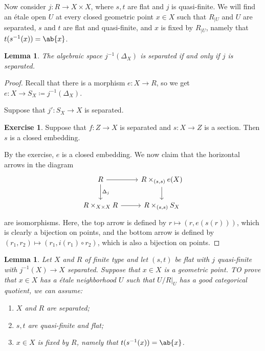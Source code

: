 \documentclass{amsart}
\newtheorem{lem}[thm]{Lemma}
\theoremstyle{definition}
\newtheorem{exer}[thm]{Exercise}
\theoremstyle{remark}
\theoremstyle{plain}
\theoremstyle{definition}
\theoremstyle{remark}
\newcommand{\1}{\mathbf{1}}
\newcommand{\2}{\mathbf{2}}
\newcommand{\3}{\mathbf{3}}
\begin{document}
    Now consider \(j \colon R \to X \times X\), where \(s,t\) are flat and \(j\) is quasi-finite. We will find an \'etale open \(U\) at every closed geometric point \(x \in X\) such that \(R_{|U}\) and \(U\) are separated, \(s\) and \(t\) are flat and quasi-finite, and \(x\) is fixed by \(R_{|U}\), namely that \(t(s^{-1}(x)) = \ab\{x\}\).

    \begin{lem}
        The algebraic space \(j^{-1}(\Delta_X)\) is separated if and only if \(j\) is separated. 
    \end{lem}
    \begin{proof}
        Recall that there is a morphism \(e \colon X \to R\), so we get \(e \colon X \to S_X \coloneqq j^{-1}(\Delta_X)\).
    
        Suppose that \(j' \colon S_X \to X\) is separated. 
        \begin{exer}
            Suppose that \(f \colon Z \to X\) is separated and \(s \colon X \to Z\) is a section. Then \(s\) is a closed embedding.
        \end{exer}
        By the exercise, \(e\) is a closed embedding. We now claim that the horizontal arrows in the diagram
        \begin{equation*}
        \begin{tikzcd}
            R \ar{r} \ar{d}{\Delta_j} & R \times_{(s,s)} e(X) \ar{d} \\
            R \times_{X \times X} R \ar{r} & R \times_{(s,s)} S_X
        \end{tikzcd}
        \end{equation*}
        are isomorphisms. Here, the top arrow is defined by \(r \mapsto (r, e(s(r)))\), which is clearly a bijection on points, and the bottom arrow is defined by \((r_1, r_2) \mapsto (r_1, i(r_1) \circ r_2)\), which is also a bijection on points.
    \end{proof}

    \begin{lem}
        Let \(X\) and \(R\) of finite type and let \((s,t)\) be flat with \(j\) quasi-finite with \(j^{-1}(X) \to X\) separated. Suppose that \(x \in X\) is a geometric point. TO prove that \(x \in X\) has a \'etale neighborhood \(U\) such that \(U/R|_U\) has a good categorical quotient, we can assume:
        \begin{enumerate}
            \item \(X\) and \(R\) are separated;
            \item \(s,t\) are quasi-finite and flat;
            \item \(x \in X\) is fixed by \(R\), namely that \(t(s^{-1}(x)) = \ab\{x\}\).
        \end{enumerate}
    \end{lem}
\end{document}
